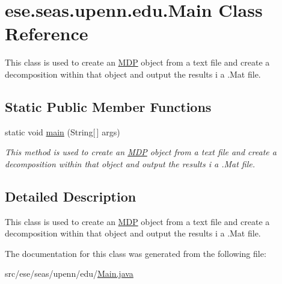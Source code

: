 \hypertarget{classese_1_1seas_1_1upenn_1_1edu_1_1_main}{}\section{ese.\+seas.\+upenn.\+edu.\+Main Class Reference}
\label{classese_1_1seas_1_1upenn_1_1edu_1_1_main}


This class is used to create an \hyperlink{classese_1_1seas_1_1upenn_1_1edu_1_1_m_d_p}{M\+D\+P} object from a text file and create a decomposition within that object and output the results i a .Mat file.  


\subsection*{Static Public Member Functions}
\begin{DoxyCompactItemize}
\item 
\hypertarget{classese_1_1seas_1_1upenn_1_1edu_1_1_main_a88eabca25558235b5b46c105c11ca794}{}static void \hyperlink{classese_1_1seas_1_1upenn_1_1edu_1_1_main_a88eabca25558235b5b46c105c11ca794}{main} (String\mbox{[}$\,$\mbox{]} args)\label{classese_1_1seas_1_1upenn_1_1edu_1_1_main_a88eabca25558235b5b46c105c11ca794}

\begin{DoxyCompactList}\small\item\em This method is used to create an \hyperlink{classese_1_1seas_1_1upenn_1_1edu_1_1_m_d_p}{M\+D\+P} object from a text file and create a decomposition within that object and output the results i a .Mat file. \end{DoxyCompactList}\end{DoxyCompactItemize}


\subsection{Detailed Description}
This class is used to create an \hyperlink{classese_1_1seas_1_1upenn_1_1edu_1_1_m_d_p}{M\+D\+P} object from a text file and create a decomposition within that object and output the results i a .Mat file. 

The documentation for this class was generated from the following file\+:\begin{DoxyCompactItemize}
\item 
src/ese/seas/upenn/edu/\hyperlink{_main_8java}{Main.\+java}\end{DoxyCompactItemize}
